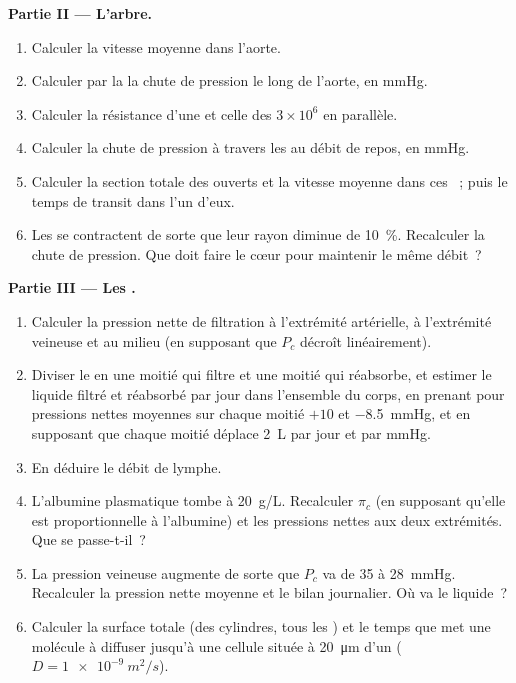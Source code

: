 \begin{problem}
\medskip
\noindent\textbf{Partie II --- L'arbre.}
\begin{enumerate}[resume]
  \item Calculer la vitesse moyenne dans l'aorte.
  \item Calculer par la  la chute de pression le long
        de l'aorte, en mmHg.
  \item Calculer la résistance d'une  et celle des $3\times
        10^{6}$  en parallèle.
  \item Calculer la chute de pression à travers les  au débit
        de repos, en mmHg.
  \item Calculer la section totale des  ouverts et la vitesse
        moyenne dans ces ~; puis le temps de transit dans l'un
        d'eux.
  \item Les  se contractent de sorte que leur rayon diminue de
        \qty{10}{\%}. Recalculer la chute de pression. Que doit faire le
        cœur pour maintenir le même débit~?
\end{enumerate}

\medskip
\noindent\textbf{Partie III --- Les .}
\begin{enumerate}[resume]
  \item Calculer la pression nette de filtration à l'extrémité
        artérielle, à l'extrémité veineuse et au milieu (en supposant que
        $P_c$ décroît linéairement).
  \item Diviser le  en une moitié qui filtre et une moitié qui
        réabsorbe, et estimer le liquide filtré et réabsorbé par jour
        dans l'ensemble du corps, en prenant pour pressions nettes
        moyennes sur chaque moitié $+10$ et
        \qty{-8.5}{mmHg}, et en supposant que chaque moitié déplace
        \qty{2}{L} par jour et par mmHg.
  \item En déduire le débit de lymphe.
  \item L'albumine plasmatique tombe à \qty{20}{g/L}. Recalculer $\pi_c$
        (en supposant qu'elle est proportionnelle à l'albumine) et les
        pressions nettes aux deux extrémités. Que se passe-t-il~?
  \item La pression veineuse augmente de sorte que $P_c$ va de 35 à
        \qty{28}{mmHg}. Recalculer la pression nette moyenne et le bilan
        journalier. Où va le liquide~?
  \item Calculer la surface  totale (des cylindres, tous les
        ) et le temps que met une molécule à diffuser jusqu'à
        une cellule située à \qty{20}{\micro m} d'un 
        ($D = \qty{1e-9}{m^2/s}$).
\end{enumerate}


\end{problem}
